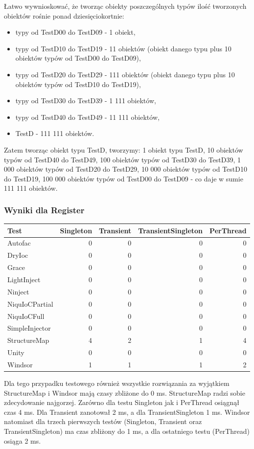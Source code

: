 \documentclass[12pt]{article}
\begin{document}
Łatwo wywnioskować, że tworząc obiekty poszczególnych typów ilość tworzonych obiektów rośnie ponad dziesięciokortnie:
\begin{itemize}
	\item typy od TestD00 do TestD09 - 1 obiekt,
	\item typy od TestD10 do TestD19 - 11 obiektów (obiekt danego typu plus 10 obiektów typów od TestD00 do TestD09),
	\item typy od TestD20 do TestD29 - 111 obiektów (obiekt danego typu plus 10 obiektów typów od TestD10 do TestD19),
	\item typy od TestD30 do TestD39 - 1 111 obiektów,
	\item  typy od TestD40 do TestD49 - 11 111 obiektów,
	\item TestD - 111 111 obiektów.
\end{itemize}
Zatem tworząc obiekt typu TestD, tworzymy: 1 obiekt typu TestD, 10 obiektów typów od TestD40 do TestD49, 100 obiektów typów od TestD30 do TestD39, 1 000 obiektów typów od TestD20 do TestD29, 10 000 obiektów typów od TestD10 do TestD19, 100 000 obiektów typów od TestD00 do TestD09 - co daje w sumie 111 111 obiektów.

\subsubsection{Wyniki dla Register}
\begin{center}
\begin{small}
	\begin{tabular}{ | l | r | r | r | r | }
    		\hline
Test & Singleton & Transient & TransientSingleton & PerThread \\ \hline
Autofac & 0 & 0 & 0 & 0 \\ \hline
DryIoc & 0 & 0 & 0 & 0 \\ \hline
Grace & 0 & 0 & 0 & 0 \\ \hline
LightInject & 0 & 0 & 0 & 0 \\ \hline
Ninject & 0 & 0 & 0 & 0 \\ \hline
NiquIoCPartial & 0 & 0 & 0 & 0 \\ \hline
NiquIoCFull & 0 & 0 & 0 & 0 \\ \hline
SimpleInjector & 0 & 0 & 0 & 0 \\ \hline
StructureMap & 4 & 2 & 1 & 4 \\ \hline
Unity & 0 & 0 & 0 & 0 \\ \hline
Windsor & 1 & 1 & 1 & 2 \\ \hline
  	\end{tabular}
\end{small}
\end{center}
Dla tego przypadku testowego również wszystkie rozwiązania za wyjątkiem StructureMap i Windsor mają czasy zbliżone do 0 ms. StructureMap radzi sobie zdecydowanie najgorzej. Zarówno dla testu Singleton jak i PerThread osiągnął czas 4 ms. Dla Transient zanotował 2 ms, a dla TransientSingleton 1 ms. Windsor natomiast dla trzech pierwszych testów (Singleton, Transient oraz TransientSingleton) ma czas zbliżony do 1 ms, a dla ostatniego testu (PerThread) osiąga 2 ms.
\end{document}
